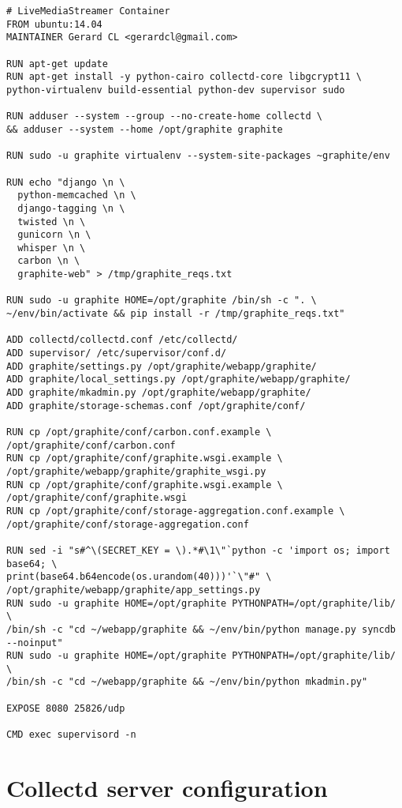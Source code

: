 \begin{verbatim}
# LiveMediaStreamer Container
FROM ubuntu:14.04
MAINTAINER Gerard CL <gerardcl@gmail.com>

RUN apt-get update
RUN apt-get install -y python-cairo collectd-core libgcrypt11 \
python-virtualenv build-essential python-dev supervisor sudo

RUN adduser --system --group --no-create-home collectd \
&& adduser --system --home /opt/graphite graphite

RUN sudo -u graphite virtualenv --system-site-packages ~graphite/env

RUN echo "django \n \
  python-memcached \n \
  django-tagging \n \
  twisted \n \
  gunicorn \n \
  whisper \n \
  carbon \n \
  graphite-web" > /tmp/graphite_reqs.txt

RUN sudo -u graphite HOME=/opt/graphite /bin/sh -c ". \
~/env/bin/activate && pip install -r /tmp/graphite_reqs.txt"

ADD collectd/collectd.conf /etc/collectd/
ADD supervisor/ /etc/supervisor/conf.d/
ADD graphite/settings.py /opt/graphite/webapp/graphite/
ADD graphite/local_settings.py /opt/graphite/webapp/graphite/
ADD graphite/mkadmin.py /opt/graphite/webapp/graphite/
ADD graphite/storage-schemas.conf /opt/graphite/conf/

RUN cp /opt/graphite/conf/carbon.conf.example \
/opt/graphite/conf/carbon.conf
RUN cp /opt/graphite/conf/graphite.wsgi.example \
/opt/graphite/webapp/graphite/graphite_wsgi.py
RUN cp /opt/graphite/conf/graphite.wsgi.example \
/opt/graphite/conf/graphite.wsgi
RUN cp /opt/graphite/conf/storage-aggregation.conf.example \
/opt/graphite/conf/storage-aggregation.conf

RUN sed -i "s#^\(SECRET_KEY = \).*#\1\"`python -c 'import os; import base64; \
print(base64.b64encode(os.urandom(40)))'`\"#" \
/opt/graphite/webapp/graphite/app_settings.py
RUN sudo -u graphite HOME=/opt/graphite PYTHONPATH=/opt/graphite/lib/ \
/bin/sh -c "cd ~/webapp/graphite && ~/env/bin/python manage.py syncdb --noinput"
RUN sudo -u graphite HOME=/opt/graphite PYTHONPATH=/opt/graphite/lib/ \
/bin/sh -c "cd ~/webapp/graphite && ~/env/bin/python mkadmin.py"

EXPOSE 8080 25826/udp

CMD exec supervisord -n
\end{verbatim}

\section{Collectd server configuration}\label{ANX:collectdFiles2}

